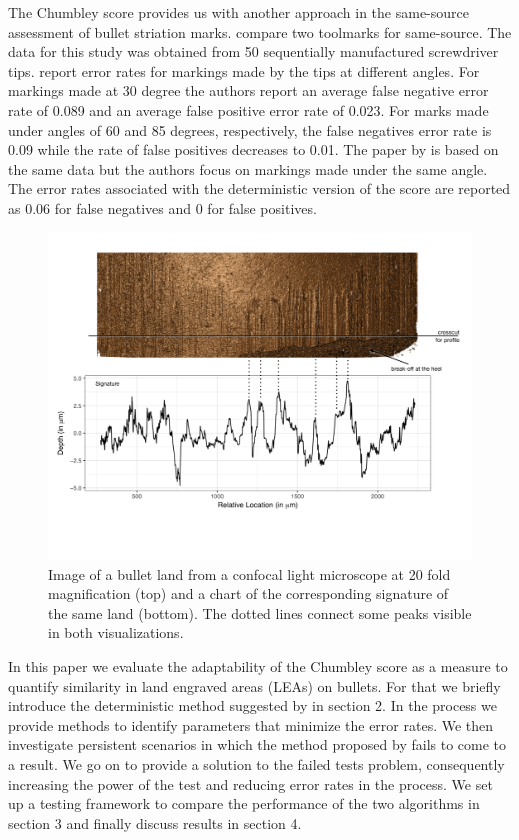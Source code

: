 \documentclass[12pt]{article}
\begin{document}
The Chumbley score provides us with another approach in the same-source
assessment of bullet striation marks. \citet{chumbley} compare two
toolmarks for same-source. The data for this study was obtained from 50
sequentially manufactured screwdriver tips. \citet{chumbley} report
error rates for markings made by the tips at different angles. For
markings made at 30 degree the authors report an average false negative
error rate of 0.089 and an average false positive error rate of 0.023.
For marks made under angles of 60 and 85 degrees, respectively, the
false negatives error rate is 0.09 while the rate of false positives
decreases to 0.01. The paper by \citet{hadler} is based on the same data
but the authors focus on markings made under the same angle. The error
rates associated with the deterministic version of the score are
reported as 0.06 for false negatives and 0 for false positives.

\begin{figure}
\centering
\includegraphics[width=\textwidth]{images/B6-B2-L6-rescaled.pdf}


\caption{\label{fig:rgl} Image of a bullet land from a confocal light microscope at 20 fold magnification (top) and a chart of the corresponding signature of the same land (bottom). The dotted lines connect some peaks visible in both visualizations.}

\end{figure}

In this paper we evaluate the adaptability of the Chumbley score as a
measure to quantify similarity in land engraved areas (LEAs) on bullets.
For that we briefly introduce the deterministic method suggested by
\citet{hadler} in section 2. In the process we provide methods to
identify parameters that minimize the error rates. We then investigate
persistent scenarios in which the method proposed by \citet{hadler}
fails to come to a result. We go on to provide a solution to the failed
tests problem, consequently increasing the power of the test and
reducing error rates in the process. We set up a testing framework to
compare the performance of the two algorithms in section 3 and finally
discuss results in section 4.
\end{document}
